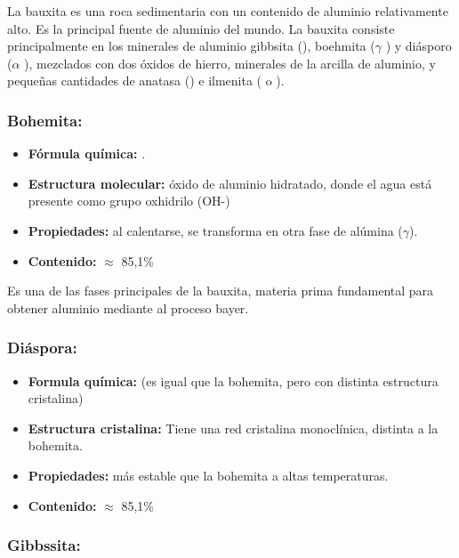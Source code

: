 \documentclass[12pt,a4paper]{article}
\begin{document}
La bauxita es una roca sedimentaria con un contenido de aluminio relativamente alto. Es la principal fuente de aluminio del mundo. La bauxita consiste principalmente en los minerales de aluminio gibbsita (), boehmita ($\gamma$ ) y diásporo ($\alpha$ ), mezclados con dos óxidos de hierro, minerales de la arcilla de aluminio, y pequeñas cantidades de anatasa () e ilmenita ( o ).

\subsubsection{Bohemita:}

\begin{itemize}
    \item \textbf{Fórmula química:} 
    .
    \item \textbf{Estructura molecular:} óxido de aluminio hidratado, donde el agua está presente como grupo oxhidrilo (OH-)
    \item \textbf{Propiedades:} al calentarse, se transforma en otra fase de alúmina ($\gamma$).
    \item \textbf{Contenido:}  $\approx$ 85,1\%
\end{itemize}

Es una de las fases principales de la bauxita, materia prima fundamental para obtener aluminio mediante al proceso bayer.

\subsubsection{Diáspora:}

\begin{itemize}
    \item \textbf{Formula química:}  (es igual que la bohemita, pero con distinta estructura cristalina)
    \item \textbf{Estructura cristalina:} Tiene una red cristalina monoclínica, distinta a la bohemita.
    \item \textbf{Propiedades:} más estable que la bohemita a altas temperaturas.
    \item \textbf{Contenido:}  $\approx$ 85,1\%
\end{itemize}

\subsubsection{Gibbssita:}
\end{document}

